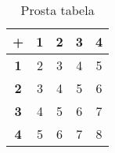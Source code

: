\begin{table}[htbp]
    \centering
    \begin{tabular}{|c|c|c|c|c|}
\hline
\textbf{+}  & \textbf{1} & \textbf{2} & \textbf{3} & \textbf{4} \\ 
\hline
\textbf{1} & 2         & 3         & 4         & 5         \\ 
\hline
\textbf{2} & 3         & 4         & 5         & 6         \\ 
\hline
\textbf{3} & 4         & 5         & 6         & 7         \\ 
\hline
\textbf{4} & 5         & 6         & 7         & 8 \\ 
\hline
\end{tabular}
    \caption{Prosta tabela}
    \label{tab:tabela}
\end{table}
